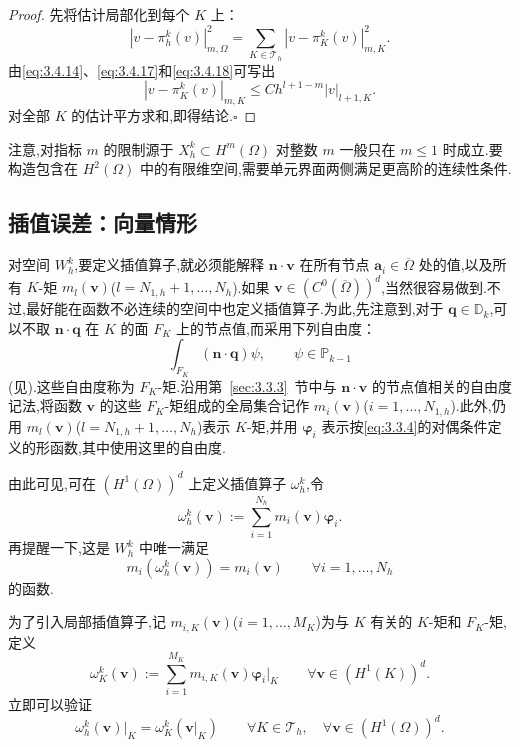 \begin{proof}
先将估计局部化到每个 \(K\) 上：
\[
  |v-\pi_h^k(v)|_{m,\Omega}^2
   =\sum_{K\in\mathcal T_h}|v-\pi_K^k(v)|_{m,K}^2.
\]
由\eqref{eq:3.4.14}、\eqref{eq:3.4.17}和\eqref{eq:3.4.18}可写出
\[
  |v-\pi_K^k(v)|_{m,K}\le Ch^{l+1-m}|v|_{l+1,K}.
\]
对全部 \(K\) 的估计平方求和,即得结论.\hfill\(\square\)
\end{proof}

注意,对指标 \(m\) 的限制源于 \(X_h^k\subset H^m(\Omega)\) 对整数 \(m\) 一般只在 \(m\le1\) 时成立.要构造包含在 \(H^2(\Omega)\) 中的有限维空间,需要单元界面两侧满足更高阶的连续性条件.

\subsection{插值误差：向量情形}\label{sec:3.4.2}

对空间 \(W_h^k\),要定义插值算子,就必须能解释 \(\boldsymbol{n}\cdot\boldsymbol{v}\) 在所有节点 \(\boldsymbol{a}_i\in\overline\Omega\) 处的值,以及所有 \(K\)-矩 \(m_l(\boldsymbol{v})\)(\(l=N_{1,h}+1,\ldots,N_h\)).如果 \(\boldsymbol{v}\in(C^0(\overline\Omega))^d\),当然很容易做到.不过,最好能在函数不必连续的空间中也定义插值算子.为此,先注意到,对于 \(\boldsymbol{q}\in\mathbb D_k\),可以不取 \(\boldsymbol{n}\cdot\boldsymbol{q}\) 在 \(K\) 的面 \(F_K\) 上的节点值,而采用下列自由度：
\[
  \int_{F_K}(\boldsymbol{n}\cdot\boldsymbol{q})\psi,\qquad \psi\in\mathbb P_{k-1}
\]
(见).这些自由度称为 \(F_K\)-矩.沿用第~\ref{sec:3.3.3}~节中与 \(\boldsymbol{n}\cdot\boldsymbol{v}\) 的节点值相关的自由度记法,将函数 \(\boldsymbol{v}\) 的这些 \(F_K\)-矩组成的全局集合记作 \(m_i(\boldsymbol{v})\)(\(i=1,\ldots,N_{1,h}\)).此外,仍用 \(m_l(\boldsymbol{v})\)(\(l=N_{1,h}+1,\ldots,N_h\))表示 \(K\)-矩,并用 \(\boldsymbol{\varphi}_i\) 表示按\eqref{eq:3.3.4}的对偶条件定义的形函数,其中使用这里的自由度.

由此可见,可在 \((H^1(\Omega))^d\) 上定义插值算子 \(\omega_h^k\),令
\begin{equation}\label{eq:3.4.20}
  \omega_h^k(\boldsymbol{v}):=\sum_{i=1}^{N_h}m_i(\boldsymbol{v})\boldsymbol{\varphi}_i.
\end{equation}
再提醒一下,这是 \(W_h^k\) 中唯一满足
\[
  m_i(\omega_h^k(\boldsymbol{v}))=m_i(\boldsymbol{v})
  \qquad \forall i=1,\ldots,N_h
\]
的函数.

为了引入局部插值算子,记 \(m_{i,K}(\boldsymbol{v})\)(\(i=1,\ldots,M_K\))为与 \(K\) 有关的 \(K\)-矩和 \(F_K\)-矩,定义
\begin{equation}\label{eq:3.4.21}
  \omega_K^k(\boldsymbol{v}):=\sum_{i=1}^{M_K}m_{i,K}(\boldsymbol{v})\boldsymbol{\varphi}_i|_K
  \qquad \forall\boldsymbol{v}\in(H^1(K))^d.
\end{equation}
立即可以验证
\begin{equation}\label{eq:3.4.22}
  \omega_h^k(\boldsymbol{v})|_K=\omega_K^k(\boldsymbol{v}|_K)
  \qquad \forall K\in\mathcal T_h,\quad \forall\boldsymbol{v}\in(H^1(\Omega))^d.
\end{equation}

